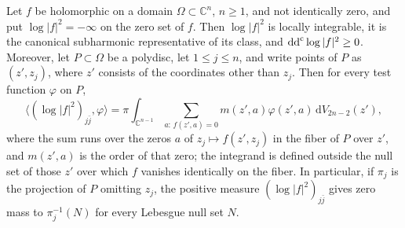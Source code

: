 \begin{proposition}\label{prop:holomorphic-logarithm-hessian}
Let $f$ be holomorphic on a domain $\Omega\subset\mathbb C^n$, $n\geq1$, and not identically zero, and put $\log|f|^2=-\infty$ on the zero set of $f$. Then $\log|f|^2$ is locally integrable, it is the canonical subharmonic representative of its class, and $\mathrm{dd}^{\mathrm{c}}\log|f|^2\geq0$. Moreover, let $P\subset\Omega$ be a polydisc, let $1\leq j\leq n$, and write points of $P$ as $(z',z_j)$, where $z'$ consists of the coordinates other than $z_j$. Then for every test function $\varphi$ on $P$,
\begin{equation}\label{eq:logarithm-coordinate-slices}
 \big\langle(\log|f|^2)_{j\bar j},\varphi\big\rangle
 =\pi\int_{\mathbb{C}^{n-1}}\sum_{a:\,f(z',a)=0}
       m(z',a)\varphi(z',a)\,\mathrm{d}V_{2n-2}(z'),
\end{equation}
where the sum runs over the zeros $a$ of $z_j\mapsto f(z',z_j)$ in the fiber of $P$ over $z'$, and $m(z',a)$ is the order of that zero; the integrand is defined outside the null set of those $z'$ over which $f$ vanishes identically on the fiber. In particular, if $\pi_j$ is the projection of $P$ omitting $z_j$, the positive measure $(\log|f|^2)_{j\bar j}$ gives zero mass to $\pi_j^{-1}(N)$ for every Lebesgue null set $N$.
\end{proposition}
